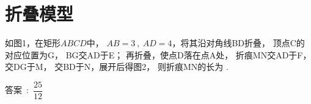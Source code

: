 \newpage
\section{折叠模型}


如图1，在矩形$ABCD$中，
$AB=3~,~AD=4$，将其沿对角线BD折叠，
顶点C的对应位置为G，
BG交AD于E；
再折叠，使点D落在点A处，
折痕MN交AD于F，交DG于M，
交BD于N，展开后得图2，
则折痕MN的长为
.

\newpage{}

答案~:~$\dfrac{25}{12}$

